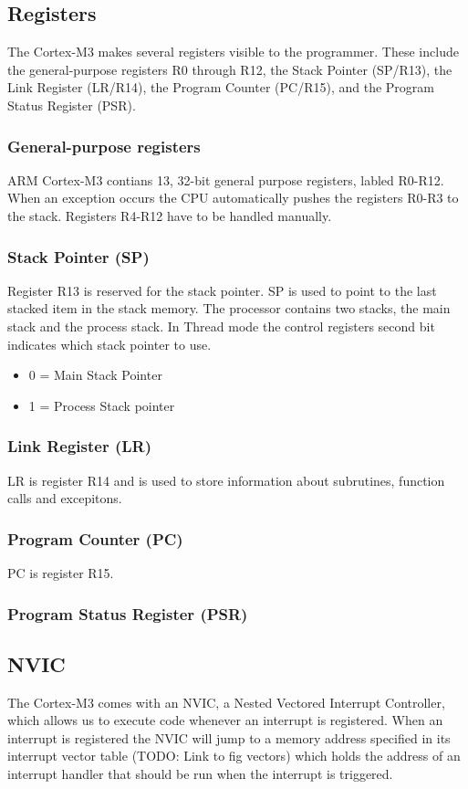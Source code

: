 \subsection{Registers}
The Cortex-M3 makes several registers visible to the programmer. These include the general-purpose registers R0 through R12, the Stack Pointer (SP/R13), the Link Register (LR/R14), the Program Counter (PC/R15), and the Program Status Register (PSR). 

\subsubsection{General-purpose registers}
ARM Cortex-M3 contians 13, 32-bit general purpose registers, labled R0-R12. When an exception occurs the CPU automatically pushes the registers R0-R3 to the stack. Registers R4-R12 have to be handled manually.

\subsubsection{Stack Pointer (SP)}
Register R13 is reserved for the stack pointer. SP is used to point to the last stacked item in the stack memory. The processor contains two stacks, the main stack and the process stack. In Thread mode the control registers second bit indicates which stack pointer to use.

\begin{itemize}
\item 0 = Main Stack Pointer
\item 1 = Process Stack pointer
\end{itemize}

\subsubsection{Link Register (LR)}
LR is register R14 and is used to store information about subrutines, function calls and excepitons.

\subsubsection{Program Counter (PC)}
PC is register R15.

\subsubsection{Program Status Register (PSR)}


\subsection{NVIC}
The Cortex-M3 comes with an NVIC, a Nested Vectored Interrupt Controller, which allows us to execute code whenever an interrupt is registered. When an interrupt is registered the NVIC will jump to a memory address specified in its interrupt vector table (TODO: Link to fig vectors) which holds the address of an interrupt handler that should be run when the interrupt is triggered.\cite{compendium}

